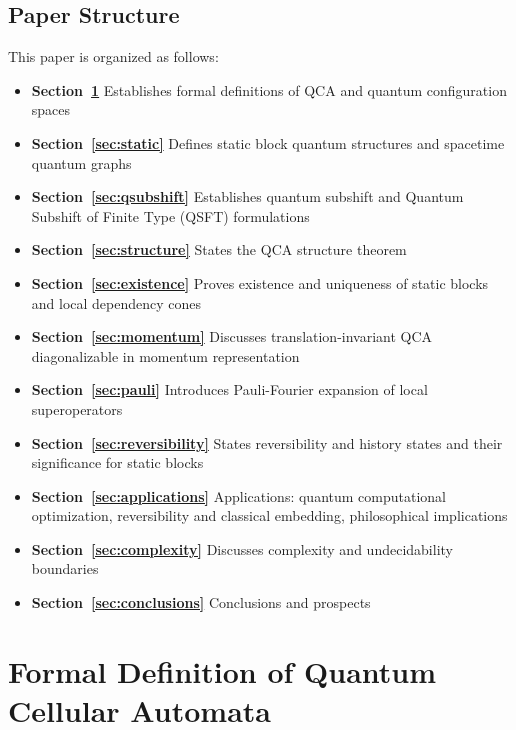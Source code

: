 \documentclass[11pt]{article}
\theoremstyle{definition}
\theoremstyle{remark}
\begin{document}
\subsection{Paper Structure}

This paper is organized as follows:

\begin{itemize}
\item \textbf{Section~\ref{sec:formal}} Establishes formal definitions of QCA and quantum configuration spaces
\item \textbf{Section~\ref{sec:static}} Defines static block quantum structures and spacetime quantum graphs
\item \textbf{Section~\ref{sec:qsubshift}} Establishes quantum subshift and Quantum Subshift of Finite Type (QSFT) formulations
\item \textbf{Section~\ref{sec:structure}} States the QCA structure theorem
\item \textbf{Section~\ref{sec:existence}} Proves existence and uniqueness of static blocks and local dependency cones
\item \textbf{Section~\ref{sec:momentum}} Discusses translation-invariant QCA diagonalizable in momentum representation
\item \textbf{Section~\ref{sec:pauli}} Introduces Pauli-Fourier expansion of local superoperators
\item \textbf{Section~\ref{sec:reversibility}} States reversibility and history states and their significance for static blocks
\item \textbf{Section~\ref{sec:applications}} Applications: quantum computational optimization, reversibility and classical embedding, philosophical implications
\item \textbf{Section~\ref{sec:complexity}} Discusses complexity and undecidability boundaries
\item \textbf{Section~\ref{sec:conclusions}} Conclusions and prospects
\end{itemize}

\section{Formal Definition of Quantum Cellular Automata}\label{sec:formal}
\end{document}
